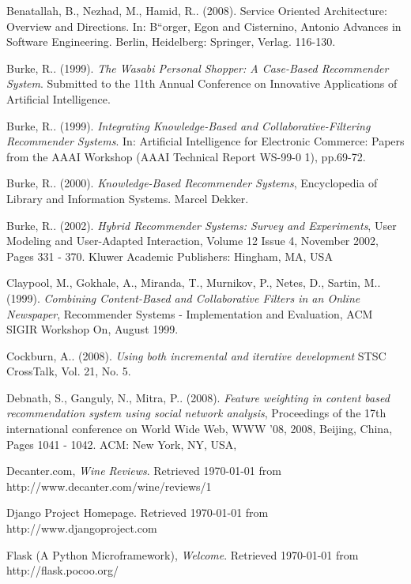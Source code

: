 \small
\raggedright
\begin{thebibliography}{9}

     Benatallah, B., Nezhad, M., Hamid, R.. (2008). Service Oriented Architecture: Overview and Directions. In: B``{o}rger, Egon and Cisternino, Antonio Advances in Software Engineering. Berlin, Heidelberg: Springer, Verlag. 116-130.

     Burke, R.. (1999). \emph{The Wasabi Personal Shopper: A Case-Based Recommender System}. Submitted to the 11th Annual Conference on Innovative Applications of Artificial Intelligence.

     Burke, R.. (1999). \emph{Integrating Knowledge-Based and Collaborative-Filtering Recommender Systems}. In: Artificial Intelligence for Electronic Commerce: Papers from the AAAI Workshop (AAAI Technical Report WS-99-0 1), pp.69-72.

     Burke, R.. (2000). \emph{Knowledge-Based Recommender Systems}, Encyclopedia of Library and Information Systems. Marcel Dekker.

     Burke, R.. (2002). \emph{Hybrid Recommender Systems: Survey and Experiments}, User Modeling and User-Adapted Interaction, Volume 12 Issue 4, November 2002, Pages 331 - 370. Kluwer Academic Publishers: Hingham, MA, USA

     Claypool, M., Gokhale, A., Miranda, T., Murnikov, P., Netes, D., Sartin, M.. (1999). \emph{Combining Content-Based and Collaborative Filters in an Online Newspaper}, Recommender Systems - Implementation and Evaluation, ACM SIGIR Workshop On, August 1999.

     Cockburn, A.. (2008). \emph{Using both incremental and iterative development} STSC CrossTalk, Vol. 21, No. 5.

     Debnath, S., Ganguly, N., Mitra, P.. (2008). \emph{Feature weighting in content based recommendation system using social network analysis}, Proceedings of the 17th international conference on World Wide Web, WWW '08, 2008, Beijing, China, Pages 1041 - 1042. ACM: New York, NY, USA,

     Decanter.com, \emph{Wine Reviews}. Retrieved \today{} from http://www.decanter.com/wine/reviews/1

     Django Project Homepage. Retrieved \today{} from http://www.djangoproject.com

     Flask (A Python Microframework), \emph{Welcome}. Retrieved \today{} from http://flask.pocoo.org/


\end{thebibliography}
